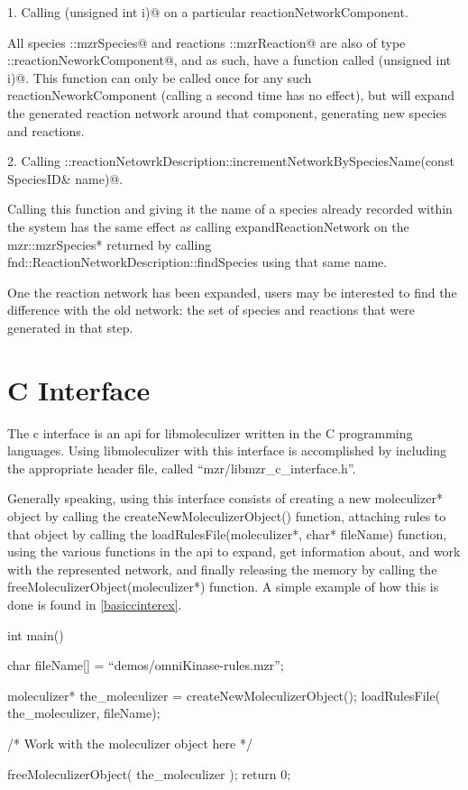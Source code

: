 1.  Calling \lstinline@expandReactionNetwork(unsigned int i)@ on a particular
reactionNetworkComponent.

All species \lstinline@mzr::mzrSpecies@ and reactions \lstinline@mzr::mzrReaction@ are
also of type \lstinline@fnd::reactionNeworkComponent@, and as such, have a function
called \lstinline@expandReactionNetwork(unsigned int i)@.  This function can only
be called once for any such reactionNeworkComponent (calling a second
time has no effect), but will expand the generated reaction network
around that component, generating new species and reactions.


2.  Calling
\lstinline@fnd::reactionNetowrkDescription::incrementNetworkBySpeciesName(const SpeciesID& name)@.  

Calling this function and giving it the name of a species already
recorded within the system has the same effect as calling
expandReactionNetwork on the mzr::mzrSpecies* returned by calling
fnd::ReactionNetworkDescription::findSpecies using that same name. 

One the reaction network has been expanded, users may be interested to
find the difference with the old network: the set of species and
reactions that were generated in that step.  


\section{C Interface}
The c interface is an api for libmoleculizer written in the C
programming languages.  Using libmoleculizer with this interface is
accomplished by including the appropriate header file, called
``mzr/libmzr\_c\_interface.h''. 

Generally speaking, using this interface consists of creating a new
moleculizer* object by calling the createNewMoleculizerObject()
function, attaching rules to that object by calling the
loadRulesFile(moleculizer*, char* fileName) function, using the
various functions in the api to expand, get information about, and
work with the represented network, and finally releasing the memory by
calling the freeMoleculizerObject(moleculizer*) function.  A simple
example of how this is done is found in \ref{basiccinterex}.

\begin{ExampleC}[caption=Basic example using the c-interface, label=basiccinterex]
  int main(){
    char fileName[] = ``demos/omniKinase-rules.mzr'';
    
    moleculizer* the_moleculizer = createNewMoleculizerObject();
    loadRulesFile( the_moleculizer, fileName);

    /* Work with the moleculizer object here */

    freeMoleculizerObject( the_moleculizer );
    return 0;
    }
\end{ExampleC}

